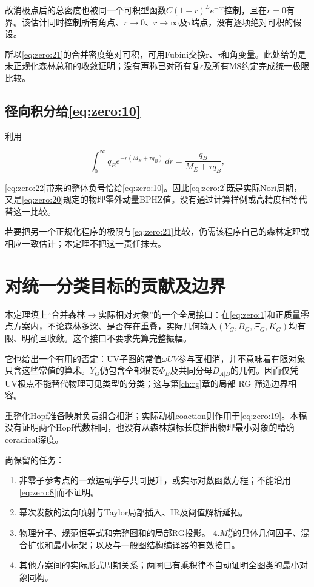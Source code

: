 \documentclass[11pt,a4paper,oneside]{ctexrep}
\theoremstyle{cnplain}
\theoremstyle{definition}
\theoremstyle{remark}
\newcommand{\tightlist}{\setlength{\itemsep}{0pt}\setlength{\parskip}{0pt}}
\begin{document}
故消极点后的总密度也被同一个可积型函数\(C(1+r)^L e^{-cr}\)控制，且在\(r=0\)有界。该估计同时控制所有角点、\(r\to 0\)、\(r\to \infty \)及\(\tau \)端点，没有逐项绝对可积的假设。

所以\eqref{eq:zero:21}的合并密度绝对可积，可用Fubini交换r、\(\tau \)和角变量。此处给的是未正规化森林总和的收敛证明；没有声称已对所有复\(\epsilon \)及所有MS约定完成统一极限比较。

\subsection{\texorpdfstring{径向积分给\eqref{eq:zero:10}}{径向积分给}}\label{sec:zero:8.3}

利用

\begin{equation}
\int_0^\infty q_Be^{-r(M_E+\tau q_B)}\,dr
                           =\frac{q_B}{M_E+\tau q_B},         \label{eq:zero:25}
\end{equation}

\eqref{eq:zero:22}带来的整体负号恰给\eqref{eq:zero:10}。因此\eqref{eq:zero:2}既是实际Nori周期，又是\eqref{eq:zero:20}规定的物理零外动量BPHZ值。没有通过计算样例或高精度相等代替这一比较。

若要把另一个正规化程序的极限与\eqref{eq:zero:21}比较，仍需该程序自己的森林定理或相应一致估计；本定理不把这一责任抹去。

\section{对统一分类目标的贡献及边界}\label{sec:zero:9}

本定理填上``合并森林\(\to \)实际相对对象''的一个全局接口：在\eqref{eq:zero:1}和正质量零点方案内，不论森林多深、是否存在重叠，实际几何输入\((Y_G,B_G,\Xi _G,K_G)\)均有限、明确且收敛。这个接口不要求先算完整振幅。

它也给出一个有用的否定：UV子图的常值\(\omega UV\)参与面相消，并不意味着有限对象只含这些常值的算术。\(Y_G\)仍包含全部根商\(\Phi _B\)及共同分母\(D_{A|B}\)的几何。因而仅凭UV极点不能替代物理可见类型的分类；这与第\ref{ch:rg}章的局部 RG 筛选边界相容。

重整化Hopf准备映射负责组合相消；实际动机coaction则作用于\eqref{eq:zero:19}。本稿没有证明两个Hopf代数相同，也没有从森林旗标长度推出物理最小对象的精确coradical深度。

尚保留的任务：

\begin{enumerate}
\def\labelenumi{\arabic{enumi}.}
\tightlist
\item
  非零子参考点的一致运动学与共同提升，或实际对数函数方程；不能沿用\eqref{eq:zero:8}而不证明。
\item
  幂次发散的法向喷射与Taylor局部插入、IR及阈值解析延拓。
\item
  物理分子、规范恒等式和完整图和的局部RG投影。 \(4. M_G^R\)的具体几何因子、混合扩张和最小标架；以及与一般图结构编译器的有效接口。
\item
  其他方案间的实际形式周期关系；两圈已有乘积律不自动证明全图类的最小对象同构。
\end{enumerate}
\end{document}
